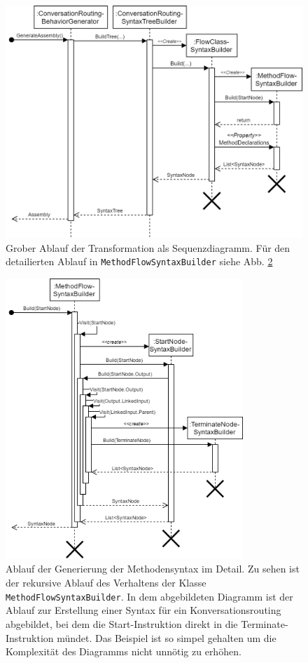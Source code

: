 \begin{figure} %
	\centering
		\includegraphics[width=\textwidth]{img/TransformationSequence.png}
	\caption[Transformatinosablauf]{Grober Ablauf der Transformation als Sequenzdiagramm. Für den detailierten Ablauf in \texttt{MethodFlowSyntaxBuilder} siehe Abb. \ref{fig:UML:TransformationSequenceDetail} }
	\label{fig:UML:TransformationSequence}
\end{figure}

\begin{figure} %
	\centering
		\includegraphics[width=0.8\textwidth]{img/TransformationSequenceDetail.png}
	\caption[Transformationsablauf im Detail]{Ablauf der Generierung der Methodensyntax im Detail. Zu sehen ist der rekursive Ablauf des Verhaltens der Klasse \texttt{MethodFlowSyntaxBuilder}. In dem abgebildeten Diagramm ist der Ablauf zur Erstellung einer Syntax für ein Konversationsrouting  abgebildet, bei dem die Start-Instruktion direkt in die Terminate-Instruktion mündet. Das Beispiel ist so simpel gehalten um die Komplexität des Diagramms nicht unnötig zu erhöhen.}
	\label{fig:UML:TransformationSequenceDetail}
\end{figure}

